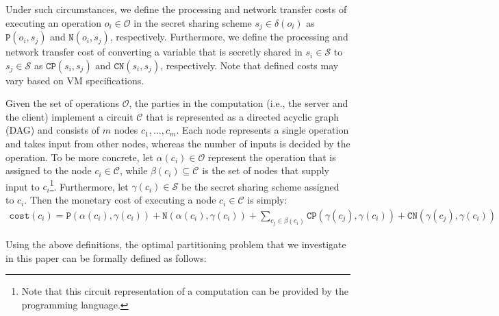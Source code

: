 \documentclass{llncs}
\begin{document}
Under such circumstances, we define the processing and network transfer costs of executing an operation $o_i\in\mathcal{O}$ in the secret sharing scheme $s_j\in\delta(o_i)$ as $\mathtt{P}(o_i, s_j)$ and $\mathtt{N}(o_i, s_j)$, respectively. Furthermore, we define the processing and network transfer cost of converting a variable that is secretly shared in $s_i\in\mathcal{S}$ to $s_j\in\mathcal{S}$ as $\mathtt{CP}(s_i, s_j)$ and $\mathtt{CN}(s_i, s_j)$, respectively. Note that defined costs may vary based on VM specifications. 

Given the set of operations $\mathcal{O}$, the parties in the computation (i.e., the server and the client) implement a circuit $\mathcal{C}$ that is represented as a directed acyclic graph (DAG) and consists of $m$ nodes $c_1, \ldots, c_m$. Each node represents a single operation and takes input from other nodes, whereas the number of inputs is decided by the operation. To be more concrete, let $\alpha(c_i)\in\mathcal{O}$ represent the operation that is assigned to the node $c_i\in\mathcal{C}$, while $\beta(c_i)\subseteq\mathcal{C}$ is the set of nodes that supply input to $c_i$\footnote{Note that this circuit representation of a computation can be provided by the programming language.}. Furthermore, let $\gamma(c_i)\in\mathcal{S}$ be the secret sharing scheme assigned to $c_i$. Then the monetary cost of executing a node $c_i\in\mathcal{C}$ is simply:
\begin{align}
	\mathtt{cost}(c_i) =  \mathtt{P}(\alpha(c_i), \gamma(c_i)) + \mathtt{N}(\alpha(c_i), \gamma(c_i)) +  \sum\limits_{c_j\in\beta(c_i)}{\mathtt{CP}(\gamma(c_j), \gamma(c_i)) + \mathtt{CN}(\gamma(c_j), \gamma(c_i))}
\end{align}

Using the above definitions, the optimal partitioning problem that we investigate in this paper can be formally defined as follows:
\end{document}
